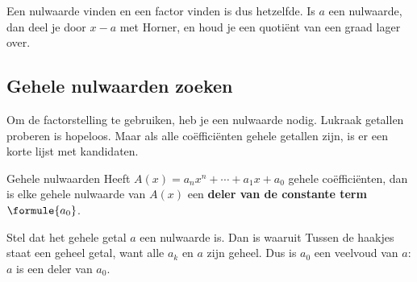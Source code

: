 Een nulwaarde vinden en een factor vinden is dus hetzelfde. Is $a$ een nulwaarde, dan deel je door $x - a$ met Horner, en houd je een quotiënt van een graad lager over.


\begin{oefeningen}
\end{oefeningen}

\subsection{Gehele nulwaarden zoeken}

Om de factorstelling te gebruiken, heb je een nulwaarde nodig. Lukraak getallen proberen is hopeloos. Maar als alle coëfficiënten gehele getallen zijn, is er een korte lijst met kandidaten.

\begin{theorie}
\begin{stelling}{Gehele nulwaarden}
Heeft $A(x) = a_n x^n + \cdots + a_1 x + a_0$ gehele coëfficiënten, dan is elke gehele nulwaarde van $A(x)$ een \textbf{\textcolor{accent}{deler van de constante term}} $\formule{a_0}$.
\end{stelling}

\begin{bewijs}
Stel dat het gehele getal $a$ een nulwaarde is. Dan is
waaruit
Tussen de haakjes staat een geheel getal, want alle $a_k$ en $a$ zijn geheel. Dus is $a_0$ een veelvoud van $a$: $a$ is een deler van $a_0$.
\end{bewijs}
\end{theorie}

